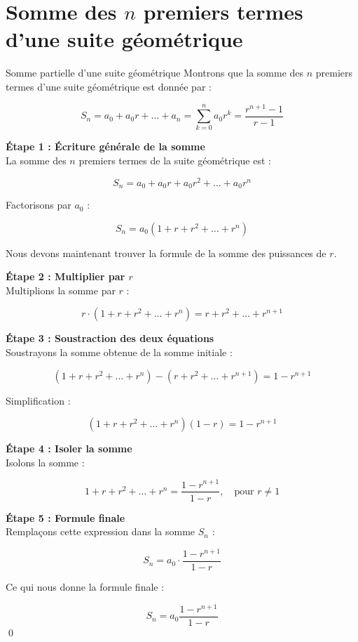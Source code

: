 \documentclass{report}
\begin{document}
    \section{Somme des $n$ premiers termes d'une suite \textcolor{myb}{\textbf{géométrique}} }
        \begin{Preuve}{Somme partielle d'une suite géométrique}{}
            Montrons que la somme des $n$ premiers termes d'une suite géométrique est 
            donnée par :

            \[
            S_n = a_0 + a_0r + \dots + a_n  =  \sum\limits_{k=0}^{n} a_0r^k = 
            \dfrac{r^{n+1} - 1}{r - 1}
            \]

            \textbf{Étape 1 : Écriture générale de la somme} \\
            La somme des $n$ premiers termes de la suite géométrique est :

            \[
            S_n = a_0 + a_0 r + a_0 r^2 + \dots + a_0 r^n
            \]

            Factorisons par $a_0$ :

            \[
            S_n = a_0 \left( 1 + r + r^2 + \dots + r^n \right)
            \]

            Nous devons maintenant trouver la formule de la somme des puissances de $r$.

            \textbf{Étape 2 : Multiplier par $r$} \\
            Multiplions la somme par $r$ :

            \[
            r \cdot \left( 1 + r + r^2 + \dots + r^n \right) = r + r^2 + \dots + r^{n+1}
            \]

            \textbf{Étape 3 : Soustraction des deux équations} \\
            Soustrayons la somme obtenue de la somme initiale :

            \[
            \left( 1 + r + r^2 + \dots + r^n \right) - \left( r + r^2 + \dots + r^{n+1} 
            \right) = 1 - r^{n+1}
            \]

            Simplification :

            \[
            \left( 1 + r + r^2 + \dots + r^n \right) (1 - r) = 1 - r^{n+1}
            \]

            \textbf{Étape 4 : Isoler la somme} \\
            Isolons la somme :

            \[
            1 + r + r^2 + \dots + r^n = \dfrac{1 - r^{n+1}}{1 - r}, \quad \text{pour } 
            r \neq 1
            \]

            \textbf{Étape 5 : Formule finale} \\
            Remplaçons cette expression dans la somme $S_n$ :

            \[
            S_n = a_0 \cdot \dfrac{1 - r^{n+1}}{1 - r}
            \]

            Ce qui nous donne la formule finale :

            \[
                \boxed{S_n = a_0 \dfrac{1 - r^{n+1}}{1 -r}}
            \]
            \qed
        \end{Preuve}
\end{document}
